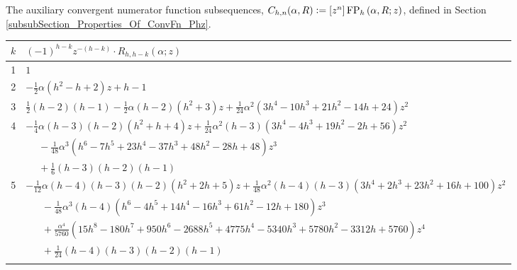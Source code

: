 \documentclass[12pt,reqno]{article}
\numberwithin{sfootnote}{section}
\newcommand{\tabletopstrut}[0]{\rule{0pt}{3ex}}
\numberwithin{equation}{section}
\theoremstyle{plain}
\theoremstyle{definition}
\theoremstyle{remark}
\newcommand{\defequals}{\ensuremath{\vcentcolon=}}
\newcommand{\ConvFP}[4]{\ensuremath{\FP_{#1}\left(#2, #3; #4\right)}}
\DeclareMathOperator{\FP}{FP}
\begin{document}
\begin{table}[h]
\begin{subtable}{\textwidth}
\end{subtable} 

\caption{The auxiliary convergent numerator function subsequences, 
         $C_{h,n}(\alpha, R) \defequals [z^n] \ConvFP{h}{\alpha}{R}{z}$,  
         defined in Section \ref{subsubSection_Properties_Of_ConvFn_Phz}.}
\label{table_ConvNumFnSeqs_Chn_AlphaR_SpCaseListings} 

\end{table} 

\setcounter{subtable}{0} 

\begin{table}[h] 
\centering 

\smaller 

\begin{subtable}{\textwidth} 
\centering 

\begin{tabular}{|c|l|} \hline 
\hline\tabletopstrut 
$k$ & $(-1)^{h-k} z^{-(h-k)} \cdot R_{h,h-k}(\alpha; z)$ \\ \hline 
1 & $1$ \\ 
2 & $-\frac{1}{2} \alpha \left(h^2-h+2\right) z+h-1$ \\ 
3 & $\frac{1}{2} (h-2) (h-1) -\frac{1}{2} \alpha (h-2) 
     \left(h^2+3\right) z+\frac{1}{24} \alpha ^2 
     \left(3 h^4-10 h^3+21 h^2-14 h+24\right) z^2$ \\ 
4 & $-\frac{1}{4} \alpha  (h-3) (h-2) \left(h^2+h+4\right) z + 
     \frac{1}{24} \alpha ^2 (h-3) \left(3 h^4-4 h^3+19 h^2-2 h+56\right) z^2$ \\ 
  & $\phantom{-\frac{1}{4}} - 
     \frac{1}{48} \alpha ^3\left(h^6-7 h^5+23 h^4-37 h^3+48 h^2-28 h+48 
     \right) z^3$ \\ 
  & $\phantom{-\frac{1}{4}} + 
      \frac{1}{6} (h-3) (h-2) (h-1)$ \\ 
5 & $-\frac{1}{12} \alpha  (h-4) (h-3) (h-2) \left(h^2+2 h+5\right) z + 
     \frac{1}{48} \alpha ^2 (h-4) (h-3) \left(3 h^4+2 h^3+23 h^2+16 h+100 
     \right) z^2$ \\ 
  & $\phantom{-\frac{1}{12}} - 
     \frac{1}{48} \alpha ^3 (h-4) 
     \left(h^6-4 h^5+14 h^4-16 h^3+61 h^2-12 h+180\right) z^3$ \\ 
  & $\phantom{-\frac{1}{12}} + 
     \frac{\alpha ^4}{5760} \left(15 h^8-180 h^7+950 h^6-2688 h^5+4775
      h^4-5340 h^3+5780 h^2-3312 h+5760\right) z^4$ \\ 
  & $\phantom{-\frac{1}{12}} + 
     \frac{1}{24} (h-4) (h-3) (h-2) (h-1)$ \\ \hline 
\hline\tabletopstrut 

\end{tabular}
\end{subtable}
\end{table}
\end{document}
